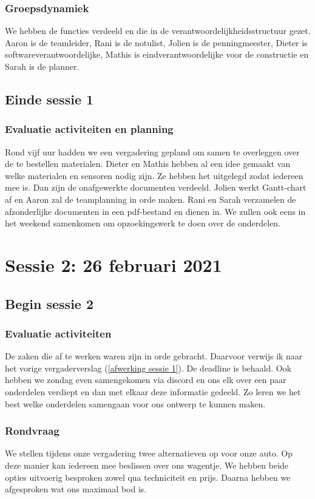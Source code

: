 \documentclass[a4paper,twoside,kulak]{kulakreport} %
\begin{document}
\subsection{Groepsdynamiek}
We hebben de functies verdeeld en die in de verantwoordelijkheidsstructuur gezet. Aaron is de teamleider, Rani is de notulist, Jolien is de penningmeester, Dieter is softwareverantwoordelijke, Mathis is eindverantwoordelijke voor de constructie en Sarah is de planner. 
\section{Einde sessie 1}
\subsection{Evaluatie activiteiten en planning}
Rond vijf uur hadden we een vergadering gepland om samen te overleggen over de te bestellen materialen. Dieter en Mathis hebben al een idee gemaakt van welke materialen en sensoren nodig zijn. Ze hebben het uitgelegd zodat iedereen mee is. Dan zijn de onafgewerkte documenten verdeeld. Jolien werkt Gantt-chart af en Aaron zal de teamplanning in orde maken. Rani en Sarah verzamelen de afzonderlijke documenten in een pdf-bestand en dienen in. We zullen ook eens in het weekend samenkomen om opzoekingswerk te doen over de onderdelen.
\label{afwerking sessie 1}


\chapter{Sessie 2: 26 februari 2021}
\section{Begin sessie 2}
\subsection{Evaluatie activiteiten}
De zaken die af te werken waren zijn in orde gebracht. Daarvoor verwijs ik naar het vorige vergaderverslag (\ref{afwerking sessie 1}). De deadline is behaald. Ook hebben we zondag even samengekomen via discord en ons elk over een paar onderdelen verdiept en dan met elkaar deze informatie gedeeld. Zo leren we het best welke onderdelen samengaan voor ons ontwerp te kunnen maken.

\subsection{Rondvraag}
We stellen tijdens onze vergadering twee alternatieven op voor onze auto. Op deze manier kan iedereen mee beslissen over ons wagentje. We hebben beide opties uitvoerig besproken zowel qua techniciteit en prijs. Daarna hebben we afgesproken wat ons maximaal bod is.
\end{document}
